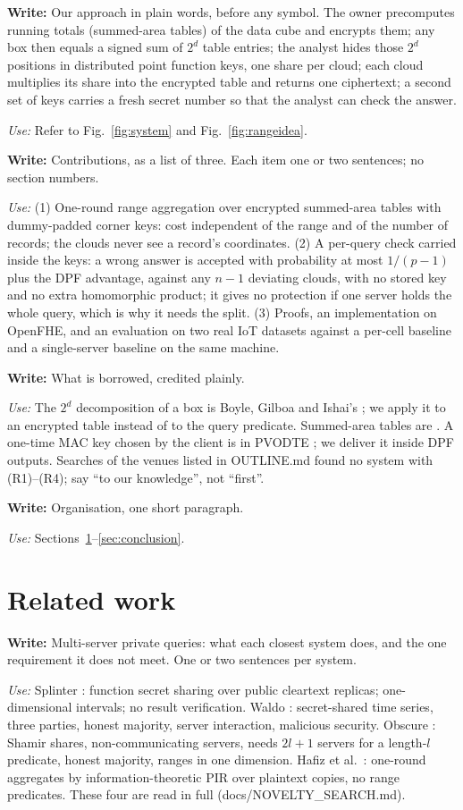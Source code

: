 \documentclass[a4paper,fleqn]{cas-sc}
\newif\ifskeleton \skeletontrue          %
\newcommand{\para}[2]{\ifskeleton\begin{parabox}\textbf{Write:} #1
  \par\smallskip\textit{Use:} #2\end{parabox}\fi}
\begin{document}
\para{Our approach in plain words, before any symbol. The owner precomputes
running totals (summed-area tables) of the data cube and encrypts them; any box
then equals a signed sum of $2^d$ table entries; the analyst hides those $2^d$
positions in distributed point function keys, one share per cloud; each cloud
multiplies its share into the encrypted table and returns one ciphertext; a
second set of keys carries a fresh secret number so that the analyst can check
the answer.}{Refer to Fig.~\ref{fig:system} and Fig.~\ref{fig:rangeidea}.}

\para{Contributions, as a list of three. Each item one or two sentences; no
section numbers.}{(1) One-round range aggregation over encrypted summed-area
tables with dummy-padded corner keys: cost independent of the range and of the
number of records; the clouds never see a record's coordinates. (2) A
per-query check carried inside the keys: a wrong answer is accepted with
probability at most $1/(p-1)$ plus the DPF advantage, against any $n-1$
deviating clouds, with no stored key and no extra homomorphic product; it gives
no protection if one server holds the whole query, which is why it needs the
split. (3) Proofs, an implementation on OpenFHE, and an evaluation on two real
IoT datasets against a per-cell baseline and a single-server baseline on the
same machine.}

\para{What is borrowed, credited plainly.}{The $2^d$ decomposition of a box is
Boyle, Gilboa and Ishai's \citep[Cor.~3.4]{boyle2016function}; we apply it to an
encrypted table instead of to the query predicate. Summed-area tables are
\citep{crow1984summed,ho1997range}. A one-time MAC key chosen by the client is
in PVODTE \citep{li2026silent}; we deliver it inside DPF outputs. Searches of
the venues listed in OUTLINE.md found no system with (R1)--(R4); say ``to our
knowledge'', not ``first''.}

\para{Organisation, one short paragraph.}{Sections~\ref{sec:related}--\ref{sec:conclusion}.}

\section{Related work}
\label{sec:related}

\para{Multi-server private queries: what each closest system does, and the one
requirement it does not meet. One or two sentences per system.}{Splinter
\citep{splinter}: function secret sharing over public cleartext replicas;
one-dimensional intervals; no result verification. Waldo \citep{waldo}:
secret-shared time series, three parties, honest majority, server interaction,
malicious security. Obscure \citep{gupta2019obscure,gupta2020obscure}: Shamir
shares, non-communicating servers, needs $2l+1$ servers for a length-$l$
predicate, honest majority, ranges in one dimension. Hafiz et al.\
\citep{hafiz2024private}: one-round aggregates by information-theoretic PIR over
plaintext copies, no range predicates. These four are read in full
(docs/NOVELTY\_SEARCH.md).}
\end{document}
